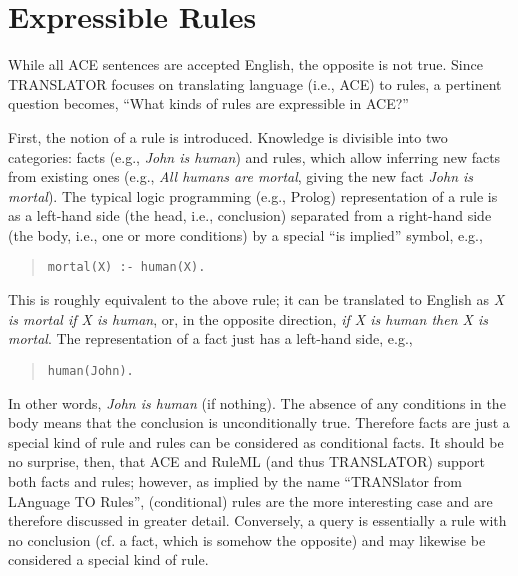 \documentclass[12pt]{report}
\begin{document}
\section{Expressible Rules}
While all ACE sentences are accepted English, the opposite is not true. Since TRANSLATOR focuses on translating language (i.e., ACE) to rules, a pertinent question becomes, ``What kinds of rules are expressible in ACE?''

First, the notion of a rule is introduced. Knowledge is divisible into two categories: facts (e.g., \textit{John is human}) and rules, which allow inferring new facts from existing ones (e.g., \textit{All humans are mortal}, giving the new fact \textit{John is mortal}). The typical logic programming (e.g., Prolog) representation of a rule is as a left-hand side (the head, i.e., conclusion) separated from a right-hand side (the body, i.e., one or more conditions) by a special ``is implied'' symbol, e.g.,
\begin{quote}
\texttt{mortal(X) :- human(X).}
\end{quote}
This is roughly equivalent to the above rule; it can be translated to English as \textit{X is mortal if X is human}, or, in the opposite direction, \textit{if X is human then X is mortal}. The representation of a fact just has a left-hand side, e.g.,
\begin{quote}
\texttt{human(John).}
\end{quote}
In other words, \textit{John is human} (if nothing). The absence of any conditions in the body means that the conclusion is unconditionally true. Therefore facts are just a special kind of rule and rules can be considered as conditional facts. It should be no surprise, then, that ACE and RuleML (and thus TRANSLATOR) support both facts and rules; however, as implied by the name ``TRANSlator from LAnguage TO Rules'', (conditional) rules are the more interesting case and are therefore discussed in greater detail. Conversely, a query is essentially a rule with no conclusion (cf. a fact, which is somehow the opposite) and may likewise be considered a special kind of rule.
\end{document}
